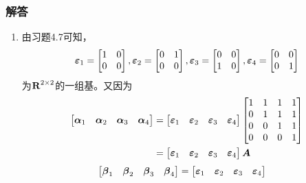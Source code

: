 \documentclass{beamer}
\begin{document}
\begin{frame}[allowframebreaks]
    \frametitle{解答}
    \begin{enumerate}
        \item {
              由习题4.7可知，
              \begin{equation*}
                  \boldsymbol{\varepsilon}_1=\begin{bmatrix}1&0\\0&0\end{bmatrix},
                  \boldsymbol{\varepsilon}_2=\begin{bmatrix}0&1\\0&0\end{bmatrix},
                  \boldsymbol{\varepsilon}_3=\begin{bmatrix}0&0\\1&0\end{bmatrix},
                  \boldsymbol{\varepsilon}_4=\begin{bmatrix}0&0\\0&1\end{bmatrix}
              \end{equation*}
              为\(\boldsymbol{\mathrm{R}}^{2\times2}\)的一组基。又因为
              \begin{align*}
                  \begin{bmatrix}\boldsymbol{\alpha}_1&\boldsymbol{\alpha}_2&\boldsymbol{\alpha}_3&\boldsymbol{\alpha}_4\end{bmatrix}
                   & =
                  \begin{bmatrix}\boldsymbol{\varepsilon}_1&\boldsymbol{\varepsilon}_2&\boldsymbol{\varepsilon}_3&\boldsymbol{\varepsilon}_4\end{bmatrix}
                  \begin{bmatrix}
                      1 & 1 & 1 & 1 \\
                      0 & 1 & 1 & 1 \\
                      0 & 0 & 1 & 1 \\
                      0 & 0 & 0 & 1
                  \end{bmatrix} \\
                   & =
                  \begin{bmatrix}\boldsymbol{\varepsilon}_1&\boldsymbol{\varepsilon}_2&\boldsymbol{\varepsilon}_3&\boldsymbol{\varepsilon}_4\end{bmatrix}\boldsymbol{A}
              \end{align*}
              \begin{align*}
                  \begin{bmatrix}\vecbeta_1&\vecbeta_2&\vecbeta_3&\vecbeta_4\end{bmatrix}
                   & =
                  \begin{bmatrix}\vecveps_1&\vecveps_2&\vecveps_3&\vecveps_4\end{bmatrix}

\end{align*}}
\end{enumerate}
\end{frame}
\end{document}
